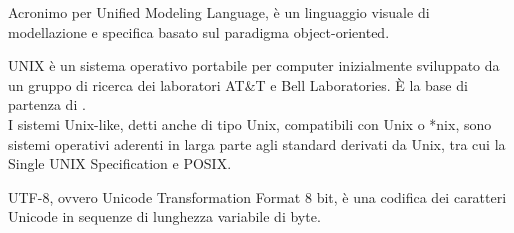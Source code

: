 Acronimo per Unified Modeling Language, è un linguaggio visuale di modellazione e specifica basato sul paradigma object-oriented.

UNIX è un sistema operativo portabile per computer inizialmente sviluppato da un gruppo di ricerca dei laboratori AT\&T e Bell Laboratories. \`{E} la base di partenza di .\\
I sistemi Unix-like, detti anche di tipo Unix, compatibili con Unix o *nix, sono sistemi operativi aderenti in larga parte agli standard derivati da Unix, tra cui la Single UNIX Specification e POSIX.

UTF-8, ovvero Unicode Transformation Format 8 bit, è una codifica dei caratteri Unicode in sequenze di lunghezza variabile di byte.
\clearpage